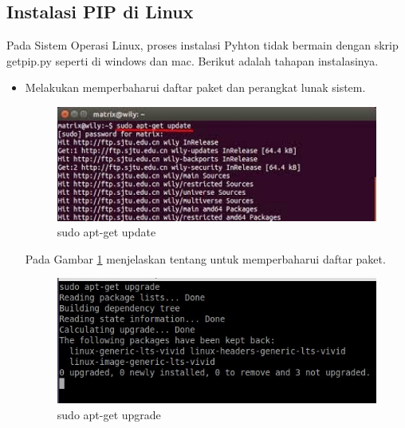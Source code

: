 \documentclass[12pt,a4paper]{article}
\begin{document}
\subsection{Instalasi PIP di Linux}
Pada Sistem Operasi Linux, proses instalasi Pyhton tidak bermain dengan skrip getpip.py seperti di windows dan mac. Berikut adalah tahapan instalasinya.
\begin{itemize}
\item Melakukan memperbaharui daftar paket dan perangkat lunak sistem.
\begin{figure}[h]
\begin{center}
\includegraphics[width=1\textwidth]{../figures/1aptupdate.jpg} 
\caption{sudo apt-get update}
\label{update}
\end{center}
\end{figure}
Pada Gambar \ref{update} menjelaskan tentang untuk memperbaharui daftar paket.
\begin{figure}[h]
\begin{center}
\includegraphics[width=1\textwidth]{../figures/1aptupgrade.jpg} 
\caption{sudo apt-get upgrade}
\label{upgrade}
\end{center}
\end{figure}


\end{itemize}
\end{document}
